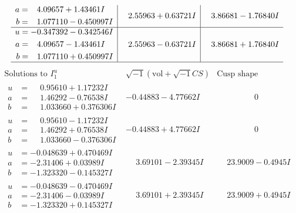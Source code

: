 \documentclass[1p]{elsarticle_modified}
\theoremstyle{definition}
\newcommand{\I}{\sqrt{-1}}
\begin{document}
$$\begin{array}{c|c|c}
\begin{aligned}
a &= \phantom{-}4.09657 + 1.43461 I \\
b &= \phantom{-}1.077110 - 0.450997 I\end{aligned}
 & \phantom{-}2.55963 + 0.63721 I & \phantom{-}3.86681 - 1.76840 I \\ \hline\begin{aligned}
u &= -0.347392 - 0.342546 I \\
a &= \phantom{-}4.09657 - 1.43461 I \\
b &= \phantom{-}1.077110 + 0.450997 I\end{aligned}
 & \phantom{-}2.55963 - 0.63721 I & \phantom{-}3.86681 + 1.76840 I\\
 \hline 
 \end{array}$$\newpage$$\begin{array}{c|c|c}  
\text{Solutions to }I^u_{1}& \I (\text{vol} + \sqrt{-1}CS) & \text{Cusp shape}\\
 \hline 
\begin{aligned}
u &= \phantom{-}0.95610 + 1.17232 I \\
a &= \phantom{-}1.46292 - 0.76538 I \\
b &= \phantom{-}1.033660 + 0.376306 I\end{aligned}
 & -0.44883 - 4.77662 I & \phantom{-0.000000 } 0 \\ \hline\begin{aligned}
u &= \phantom{-}0.95610 - 1.17232 I \\
a &= \phantom{-}1.46292 + 0.76538 I \\
b &= \phantom{-}1.033660 - 0.376306 I\end{aligned}
 & -0.44883 + 4.77662 I & \phantom{-0.000000 } 0 \\ \hline\begin{aligned}
u &= -0.048639 + 0.470469 I \\
a &= -2.31406 + 0.03989 I \\
b &= -1.323320 - 0.145327 I\end{aligned}
 & \phantom{-}3.69101 - 2.39345 I & \phantom{-}23.9009 - 0.4945 I \\ \hline\begin{aligned}
u &= -0.048639 - 0.470469 I \\
a &= -2.31406 - 0.03989 I \\
b &= -1.323320 + 0.145327 I\end{aligned}
 & \phantom{-}3.69101 + 2.39345 I & \phantom{-}23.9009 + 0.4945 I \\ \hline\begin{aligned}

\end{aligned}
\end{array}$$
\end{document}
